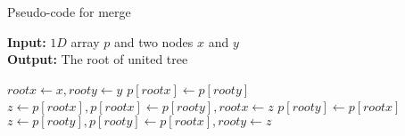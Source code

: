 \begin{algorithm}[ht]
\small
{
	\caption{Pseudo-code for merge}
	\label{alg:merge}
	\textbf{Input:} $1D$ array $p$ and two nodes $x$ and $y$ \\
	\textbf{Output:} The root of united tree 
	\begin{algorithmic}[1]
		\State $rootx \gets x, rooty \gets y$
					\State $p[rootx] \gets p[rooty]$
					\State {}
				\EndIf
				\State $z \gets p[rootx], p[rootx] \gets p[rooty], rootx \gets z$
			\Else
					\State $p[rooty] \gets p[rootx]$
					\State {}
				\EndIf
				\State $z \gets p[rooty], p[rooty] \gets p[rootx], rooty \gets z$
			\EndIf
		\EndWhile
		\State {}
	\EndFunction
	\end{algorithmic}	
}
\end{algorithm}
